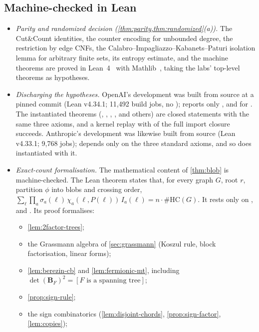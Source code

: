 \documentclass[11pt]{amsart}
\theoremstyle{plain}
\theoremstyle{definition}
\theoremstyle{remark}
\numberwithin{equation}{section}
\begin{document}
\subsection{Machine-checked in Lean}
\begin{itemize}
\item \emph{Parity and randomized decision (\cref{thm:parity,thm:randomized}(a)).} The
Cut\&Count identities, the counter encoding for unbounded degree, the restriction by edge CNFs,
the Calabro--Impagliazzo--Kabanets--Paturi isolation lemma for arbitrary finite sets, its entropy
estimate, and the machine theorems are proved in Lean~4~\cite{Lean4} with Mathlib~\cite{Mathlib20},
taking the labs' top-level theorems as hypotheses.
\item \emph{Discharging the hypotheses.} OpenAI's development was built from source at a pinned
commit (Lean v4.34.1; 11{,}492 build jobs, no );  reports only
,  and  for .
The instantiated theorems (,
, ,
, and others) are closed statements with the same three
axioms, and a kernel replay with  of the full import closure succeeds.
Anthropic's development was likewise built from source (Lean v4.33.1; 9{,}768 jobs);
 depends only on the three standard axioms, and so does
 instantiated with it.
\item \emph{Exact-count formalisation.} The mathematical content of \cref{thm:blob} is
machine-checked. The Lean theorem  states that, for every graph $G$, root
$r$, partition $\phi$ into blobs and crossing order,
$\sum_{\ell}\prod_a \sigma_a(\ell)\,\chi_a(\ell,P(\ell))\,I_a(\ell)=n\cdot\#\mathrm{HC}(G)$.
It rests only on ,  and . Its proof
formalises:
\begin{itemize}
\item \cref{lem:2factor-trees};
\item the Grassmann algebra of \cref{sec:grassmann} (Koszul rule, block factorisation, linear
forms);
\item \cref{lem:berezin-cb} and \cref{lem:fermionic-mt}, including
$\det(\mathbf B_F)^2=[F\text{ is a spanning tree}]$;
\item \cref{prop:sign-rule};
\item the sign combinatorics (\cref{lem:disjoint-chords}, \cref{prop:sign-factor}, \cref{lem:copies});

\end{itemize}
\end{itemize}
\end{document}
